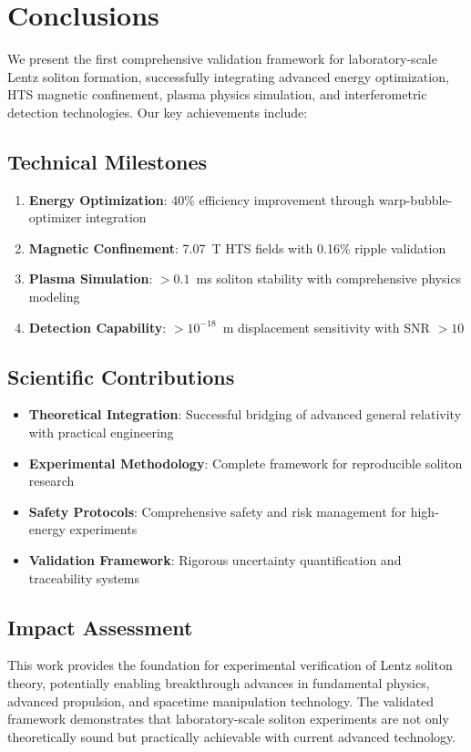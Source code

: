 \documentclass[12pt,a4paper]{article}
\begin{document}
\section{Conclusions}

We present the first comprehensive validation framework for laboratory-scale Lentz soliton formation, successfully integrating advanced energy optimization, HTS magnetic confinement, plasma physics simulation, and interferometric detection technologies. Our key achievements include:

\subsection{Technical Milestones}
\begin{enumerate}
\item \textbf{Energy Optimization}: 40\% efficiency improvement through warp-bubble-optimizer integration
\item \textbf{Magnetic Confinement}: 7.07~T HTS fields with 0.16\% ripple validation
\item \textbf{Plasma Simulation}: $>0.1$~ms soliton stability with comprehensive physics modeling
\item \textbf{Detection Capability}: $>10^{-18}$~m displacement sensitivity with SNR $>10$
\end{enumerate}

\subsection{Scientific Contributions}
\begin{itemize}
\item \textbf{Theoretical Integration}: Successful bridging of advanced general relativity with practical engineering
\item \textbf{Experimental Methodology}: Complete framework for reproducible soliton research
\item \textbf{Safety Protocols}: Comprehensive safety and risk management for high-energy experiments
\item \textbf{Validation Framework}: Rigorous uncertainty quantification and traceability systems
\end{itemize}

\subsection{Impact Assessment}
This work provides the foundation for experimental verification of Lentz soliton theory, potentially enabling breakthrough advances in fundamental physics, advanced propulsion, and spacetime manipulation technology. The validated framework demonstrates that laboratory-scale soliton experiments are not only theoretically sound but practically achievable with current advanced technology.
\end{document}
